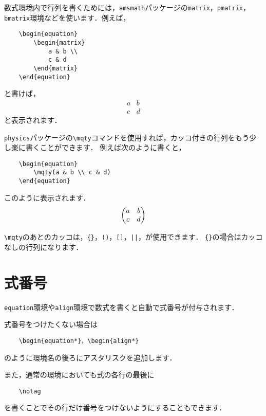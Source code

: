 \documentclass[a4paper,11pt]{jsreport}
\numberwithin{equation}{section}
\theoremstyle{definition}
\begin{document}
数式環境内で行列を書くためには，\verb|amsmath|パッケージの\verb|matrix|，\verb|pmatrix|，\verb|bmatrix|環境などを使います．例えば，
\begin{verbatim}
    \begin{equation}
        \begin{matrix}
            a & b \\
            c & d
        \end{matrix}
    \end{equation}
\end{verbatim}
と書けば，
\begin{equation}
    \begin{matrix}
        a & b \\
        c & d
    \end{matrix}
\end{equation}
と表示されます．

\verb|physics|パッケージの\verb|\mqty|コマンドを使用すれば，カッコ付きの行列をもう少し楽に書くことができます．
例えば次のように書くと，
\begin{verbatim}
    \begin{equation}
        \mqty(a & b \\ c & d)
    \end{equation}
\end{verbatim}
このように表示されます．
\begin{equation}
    \mqty(a & b \\ c & d)
\end{equation}

\verb|\mqty|のあとのカッコは，\verb|{}|，\verb|()|，\verb|[]|，\verb+||+，が使用できます\cite{physics}．
\verb|{}|の場合はカッコなしの行列になります．


\section{式番号}

\verb|equation|環境や\verb|align|環境で数式を書くと自動で式番号が付与されます．

式番号をつけたくない場合は
\begin{verbatim}
    \begin{equation*}，\begin{align*}
\end{verbatim}
のように環境名の後ろにアスタリスクを追加します．

また，通常の環境においても式の各行の最後に
\begin{verbatim}
    \notag
\end{verbatim}
を書くことでその行だけ番号をつけないようにすることもできます．
\end{document}
